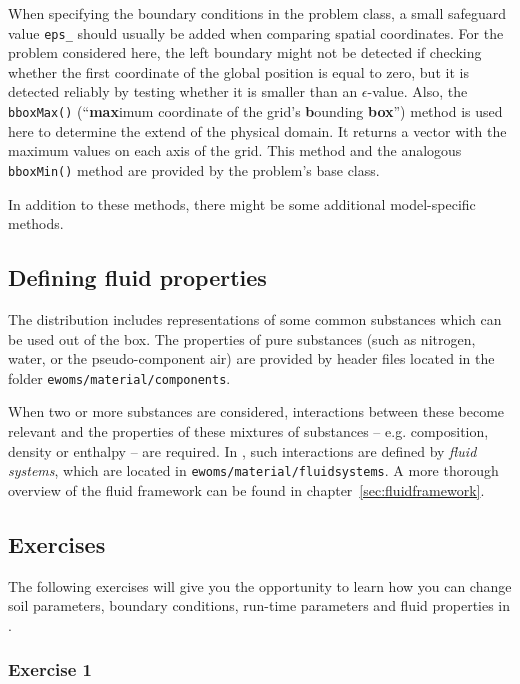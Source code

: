 When specifying the boundary conditions in the problem class, a small
safeguard value \texttt{eps\_} should usually be added when comparing
spatial coordinates. For the problem considered here, the left
boundary might not be detected if checking whether the first
coordinate of the global position is equal to zero, but it is detected
reliably by testing whether it is smaller than an
$\epsilon$-value. Also, the \texttt{bboxMax()} (``\textbf{max}imum
coordinate of the grid's \textbf{b}ounding \textbf{box}'') method is
used here to determine the extend of the physical domain. It returns a
vector with the maximum values on each axis of the grid. This method
and the analogous \texttt{bboxMin()} method are provided by the
problem's base class.

In addition to these methods, there might be some additional
model-specific methods. 

\subsection{Defining fluid properties}
\label{tutorial1:description-fluid-class}

The \eWoms distribution includes representations of some common
substances which can be used out of the box. The properties of pure
substances (such as nitrogen, water, or the pseudo-component air) are
provided by header files located in the folder
\texttt{ewoms/material/components}.

When two or more substances are considered, interactions between these
become relevant and the properties of these mixtures of substances --
e.g. composition, density or enthalpy -- are required. In \eWoms, such
interactions are defined by {\em fluid systems}, which are located in
\texttt{ewoms/material/fluidsystems}. A more thorough overview of the
\eWoms fluid framework can be found in
chapter~\ref{sec:fluidframework}.

\subsection{Exercises}
\label{tutorial1:exercises}

The following exercises will give you the opportunity to learn how you
can change soil parameters, boundary conditions, run-time parameters
and fluid properties in \eWoms.

\subsubsection{Exercise 1}

